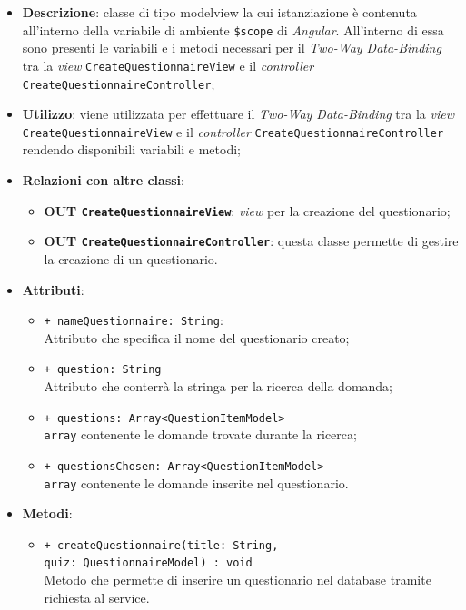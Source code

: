 	\begin{itemize}
		\item \textbf{Descrizione}: classe di tipo modelview la cui istanziazione è contenuta all'interno della variabile di ambiente \texttt{\$scope} di \textit{Angular}. All'interno di essa sono presenti le variabili e i metodi necessari per il \textit{Two-Way Data-Binding} tra la \textit{view} \texttt{CreateQuestionnaireView} e il \textit{controller} \texttt{CreateQuestionnaireController};
		\item \textbf{Utilizzo}: viene utilizzata per effettuare il \textit{Two-Way Data-Binding} tra la \textit{view}\\ \texttt{CreateQuestionnaireView} e il \textit{controller} \texttt{CreateQuestionnaireController} rendendo disponibili variabili e metodi;
		\item \textbf{Relazioni con altre classi}: 
		\begin{itemize}
			\item \textbf{OUT \texttt{CreateQuestionnaireView}}: \textit{view} per la creazione del questionario; 
			\item \textbf{OUT \texttt{CreateQuestionnaireController}}: questa classe permette di gestire la creazione di un questionario.
		\end{itemize}
		\item \textbf{Attributi}: 
		\begin{itemize}
			\item \texttt{+ nameQuestionnaire: String}: \\ Attributo che specifica il nome del questionario creato;
			\item \texttt{+ question: String} \\ Attributo che conterrà la stringa per la ricerca della domanda;
			\item \texttt{+ questions: Array<QuestionItemModel>} \\ \texttt{array} contenente le domande trovate durante la ricerca;
			\item \texttt{+ questionsChosen: Array<QuestionItemModel>} \\ \texttt{array} contenente le domande inserite nel questionario.
		\end{itemize}
		\item \textbf{Metodi}: 
		\begin{itemize}
			\item \texttt{+ createQuestionnaire(title: String, \\quiz: QuestionnaireModel) : void} \\Metodo che permette di inserire un questionario nel database tramite richiesta al service. \\

\end{itemize}
\end{itemize}
